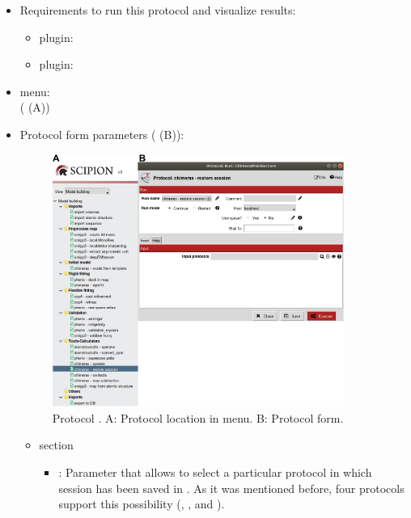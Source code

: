 \begin{itemize}
  \item Requirements to run this protocol and visualize results:
    \begin{itemize}
        \item \scipion plugin: 
        \item \scipion plugin: 
    \end{itemize}
  \item \scipion menu:\\
    ( (A))
  
  \item Protocol form parameters ( (B)):
  
    \begin{figure}[H]
     \centering 
     \captionsetup{width=.7\linewidth} 
     \includegraphics[width=0.90\textwidth]{Images_appendix/Fig118.pdf}
     \caption{Protocol . A: Protocol location in \scipion menu. B: Protocol form.}
     \label{fig:app_protocol_chimera_3}
    \end{figure}
    
    \begin{itemize}
     \item {} section

    \begin{itemize}
     \item {}: Parameter that allows to select a particular protocol in which \chimera session has been saved in \scipion. As it was mentioned before, four protocols support this possibility (\chimera {}, \chimera {}, \chimera {} and \chimera {}).
     

\end{itemize}
\end{itemize}
\end{itemize}
